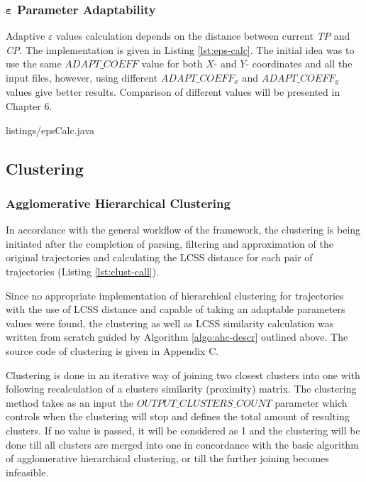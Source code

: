 \subsubsection{$\bm{\varepsilon}$ Parameter Adaptability}

Adaptive $\varepsilon$ values calculation depends on the distance between current \textit{TP} and \textit{CP}. The implementation is given in Listing \ref{lst:eps-calc}. The initial idea was to use the same $ADAPT\_COEFF$ value for both $X$- and $Y$- coordinates and all the input files, however, using different $ADAPT\_COEFF_x$ and $ADAPT\_COEFF_y$ values give better results. Comparison of different values will be presented in Chapter 6.

 {listings/epsCalc.java}

\subsection{Clustering}

\subsubsection{Agglomerative Hierarchical Clustering}

In accordance with the general workflow of the framework, the clustering is being initiated after the completion of parsing, filtering and approximation of the original trajectories and calculating the LCSS distance for each pair of trajectories (Listing \ref{lst:clust-call}).



Since no appropriate implementation of hierarchical clustering for trajectories with the use of LCSS distance and capable of taking an adaptable parameters values were found, the clustering as well as LCSS similarity calculation was written from scratch guided by Algorithm \ref{algo:ahc-descr} outlined above. The source code of clustering is given in Appendix C.

Clustering is done in an iterative way of joining two closest clusters into one with following recalculation of a clusters similarity (proximity) matrix. The clustering method takes as an input the $OUTPUT\_CLUSTERS\_COUNT$ parameter which controls when the clustering will stop and defines the total amount of resulting clusters. If no value is passed, it will be considered as 1 and the clustering will be done till all clusters are merged into one in concordance with the basic algorithm of agglomerative hierarchical clustering, or till the further joining becomes infeasible.

